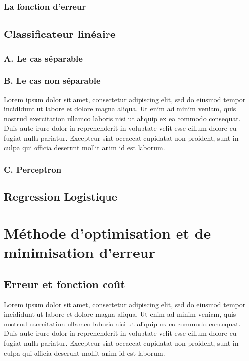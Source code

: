 		\subsubsection{La fonction d'erreur}
	\subsection{Classificateur linéaire}
	\subsubsection[A]{A. Le cas séparable }
	\subsubsection[B]{B. Le cas non séparable }
		Lorem ipsum dolor sit amet, consectetur adipiscing elit, sed do eiusmod tempor incididunt ut labore et dolore magna aliqua. Ut enim ad minim veniam, quis nostrud exercitation ullamco laboris nisi ut aliquip ex ea commodo consequat. Duis aute irure dolor in reprehenderit in voluptate velit esse cillum dolore eu fugiat nulla pariatur. Excepteur sint occaecat cupidatat non proident, sunt in culpa qui officia deserunt mollit anim id est laborum.
	\subsubsection{C. Perceptron}
	\subsection{Regression Logistique}
		
		
		
	\section{Méthode d'optimisation et de minimisation d'erreur}
	\subsection{Erreur et fonction coût}
		Lorem ipsum dolor sit amet, consectetur adipiscing elit, sed do eiusmod tempor incididunt ut labore et dolore magna aliqua. Ut enim ad minim veniam, quis nostrud exercitation ullamco laboris nisi ut aliquip ex ea commodo consequat. Duis aute irure dolor in reprehenderit in voluptate velit esse cillum dolore eu fugiat nulla pariatur. Excepteur sint occaecat cupidatat non proident, sunt in culpa qui officia deserunt mollit anim id est laborum.
			
